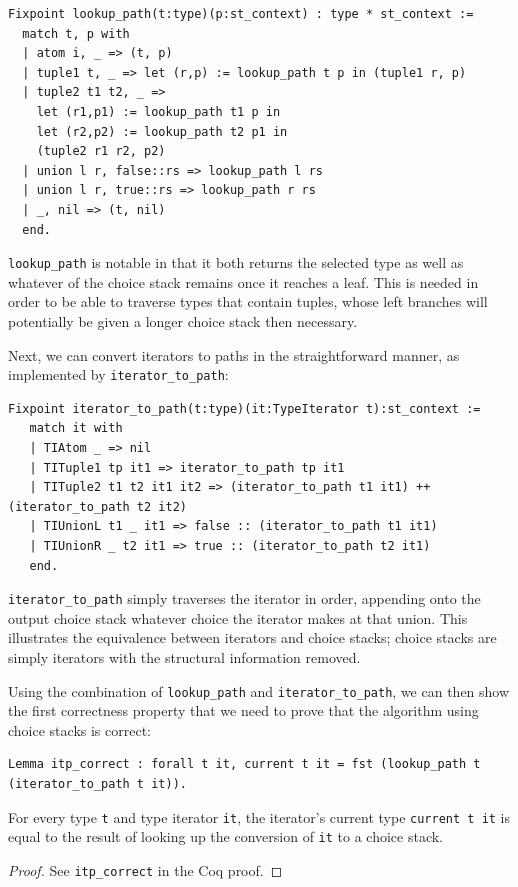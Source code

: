 \documentclass[a4paper,english]{lipics-v2018}
\begin{document}
\begin{verbatim}
Fixpoint lookup_path(t:type)(p:st_context) : type * st_context :=
  match t, p with
  | atom i, _ => (t, p)
  | tuple1 t, _ => let (r,p) := lookup_path t p in (tuple1 r, p)
  | tuple2 t1 t2, _ =>
    let (r1,p1) := lookup_path t1 p in
    let (r2,p2) := lookup_path t2 p1 in
    (tuple2 r1 r2, p2)
  | union l r, false::rs => lookup_path l rs
  | union l r, true::rs => lookup_path r rs
  | _, nil => (t, nil)
  end.
\end{verbatim}

\verb|lookup_path| is notable in that it both returns the selected type as
well as whatever of the choice stack remains once it reaches a leaf. This is
needed in order to be able to traverse types that contain tuples,  whose left
branches will potentially be given a longer choice stack then necessary.

Next, we can convert iterators to paths in the straightforward manner, as
implemented by \verb|iterator_to_path|:

\begin{verbatim}
Fixpoint iterator_to_path(t:type)(it:TypeIterator t):st_context :=
   match it with
   | TIAtom _ => nil
   | TITuple1 tp it1 => iterator_to_path tp it1
   | TITuple2 t1 t2 it1 it2 => (iterator_to_path t1 it1) ++ (iterator_to_path t2 it2)
   | TIUnionL t1 _ it1 => false :: (iterator_to_path t1 it1)
   | TIUnionR _ t2 it1 => true :: (iterator_to_path t2 it1)
   end.
\end{verbatim}

\verb|iterator_to_path| simply traverses the iterator in order, appending onto the
output choice stack whatever choice the iterator makes at that union. This illustrates
the equivalence between iterators and choice stacks; choice stacks are simply iterators
with the structural information removed.

Using the combination of \verb|lookup_path| and \verb|iterator_to_path|, we
can then show the first correctness property that we need to prove that the
algorithm using choice stacks is correct:

\begin{lemma}
\begin{verbatim}
Lemma itp_correct : forall t it, current t it = fst (lookup_path t (iterator_to_path t it)).
\end{verbatim}

For every type \verb|t| and type iterator \verb|it|, the iterator's current type \verb|current t it| is equal
to the result of looking up the conversion of \verb|it| to a choice stack.
\end{lemma}
\begin{proof}
See \verb|itp_correct| in the Coq proof.
\end{proof}
\end{document}
